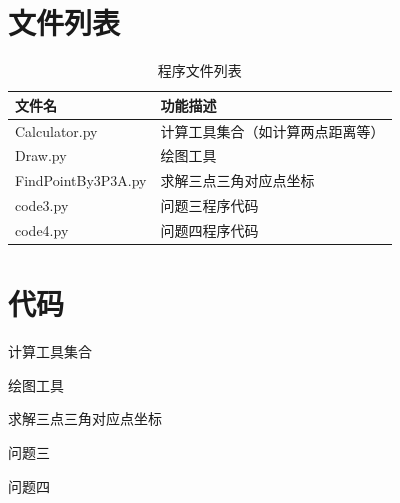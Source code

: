 \documentclass[withoutpreface,bwprint]{cumcmthesis} %
\begin{document}
\begin{appendices}

\section{文件列表}
\begin{table}[H]
    \caption{程序文件列表}
    \centering
    \begin{tabularx}{\textwidth}{l X}
        \bottomrule
        文件名 & 功能描述 \\
        \midrule
        Calculator.py & 计算工具集合（如计算两点距离等） \\
        Draw.py & 绘图工具 \\
        FindPointBy3P3A.py & 求解三点三角对应点坐标 \\
        code3.py & 问题三程序代码 \\
        code4.py & 问题四程序代码 \\
        \bottomrule
    \end{tabularx}
    \label{tab:文件列表}
\end{table}

\section{代码}
计算工具集合

绘图工具

求解三点三角对应点坐标

问题三

问题四


\end{appendices}
\end{document}
